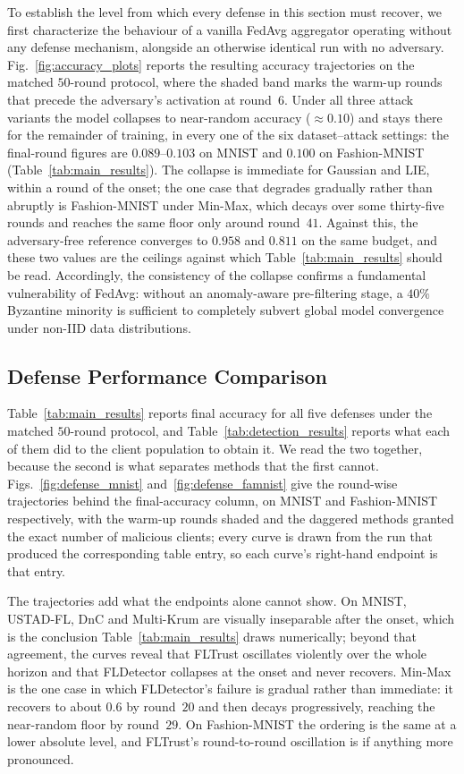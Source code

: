 \documentclass[journal]{IEEEtran}
\begin{document}
To establish the level from which every defense in this section must recover, we first characterize the behaviour of a vanilla FedAvg aggregator operating without any defense mechanism, alongside an otherwise identical run with no adversary. Fig.~\ref{fig:accuracy_plots} reports the resulting accuracy trajectories on the matched $50$-round protocol, where the shaded band marks the warm-up rounds that precede the adversary's activation at round~$6$. Under all three attack variants the model collapses to near-random accuracy ($\approx 0.10$) and stays there for the remainder of training, in every one of the six dataset--attack settings: the final-round figures are $0.089$--$0.103$ on MNIST and $0.100$ on Fashion-MNIST (Table~\ref{tab:main_results}). The collapse is immediate for Gaussian and LIE, within a round of the onset; the one case that degrades gradually rather than abruptly is Fashion-MNIST under Min-Max, which decays over some thirty-five rounds and reaches the same floor only around round~$41$. Against this, the adversary-free reference converges to $0.958$ and $0.811$ on the same budget, and these two values are the ceilings against which Table~\ref{tab:main_results} should be read. Accordingly, the consistency of the collapse confirms a fundamental vulnerability of FedAvg: without an anomaly-aware pre-filtering stage, a $40\%$ Byzantine minority is sufficient to completely subvert global model convergence under non-IID data distributions.


\subsection{Defense Performance Comparison}
\label{sec:defense_comparison}

Table~\ref{tab:main_results} reports final accuracy for all five defenses under the matched
$50$-round protocol, and Table~\ref{tab:detection_results} reports what each of them did to
the client population to obtain it. We read the two together, because the second is what
separates methods that the first cannot. Figs.~\ref{fig:defense_mnist}
and~\ref{fig:defense_famnist} give the round-wise trajectories behind the final-accuracy
column, on MNIST and Fashion-MNIST respectively, with the warm-up rounds shaded and the
daggered methods granted the exact number of malicious clients; every curve is drawn from the
run that produced the corresponding table entry, so each curve's right-hand endpoint is that
entry.

The trajectories add what the endpoints alone cannot show. On MNIST, USTAD-FL, DnC and
Multi-Krum are visually inseparable after the onset, which is the conclusion
Table~\ref{tab:main_results} draws numerically; beyond that agreement, the curves reveal that
FLTrust oscillates violently over the whole horizon and that FLDetector collapses at the onset
and never recovers. Min-Max is the one case in which FLDetector's failure is gradual rather
than immediate: it recovers to about $0.6$ by round~$20$ and then decays progressively,
reaching the near-random floor by round~$29$. On Fashion-MNIST the ordering is the same at a
lower absolute level, and FLTrust's round-to-round oscillation is if anything more pronounced.
\end{document}
